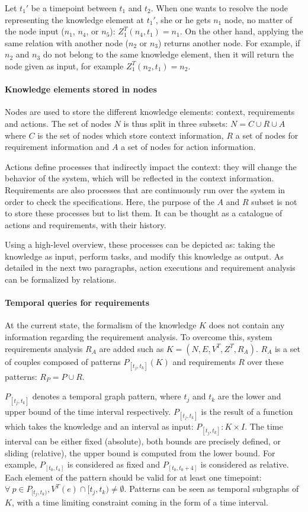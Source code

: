 Let $t_1'$ be a timepoint between $t_1$ and $t_2$.
When one wants to resolve the node representing the knowledge element at $t_1'$, she or he gets $n_1$ node, no matter of the node input ($n_1$, $n_4$, or $n_5$): $Z^{T}_1(n_4, t_1) = n_1$.
On the other hand, applying the same relation with another node ($n_2$ or $n_3$) returns another node.
For example, if $n_2$ and $n_3$ do not belong to the same knowledge element, then it will return the node given as input, for example $Z^{T}_1(n_2, t_1) = n_2$.

\paragraph{Knowledge elements stored in nodes}
Nodes are used to store the different knowledge elements: context, requirements and actions.
The set of nodes $N$ is thus split in three subsets: $N = C \cup R \cup A$ where $C$ is the set of nodes which store context information, $R$ a set of nodes for requirement information and $A$ a set of nodes for action information.

Actions define processes that indirectly impact the context: they will change the behavior of the system, which will be reflected in the context information.
Requirements are also processes that are continuously run over the system in order to check the specifications.
Here, the purpose of the $A$ and $R$ subset is not to store these processes but to list them.
It can be thought as a catalogue of actions and requirements, with their history.

Using a high-level overview, these processes can be depicted as: taking the knowledge as input, perform tasks, and modify this knowledge as output.
As detailed in the next two paragraphs, action executions and requirement analysis can be formalized by relations.

\paragraph{Temporal queries for requirements}
At the current state, the formalism of the knowledge $K$ does not contain any information regarding the requirement analysis.
To overcome this, system requirements analysis $R_A$ are added such as $K = (N, E, V^T, Z^T, R_A)$.
$R_A$ is a set of couples composed of patterns $P_{[t_j,t_k]}(K)$ and requirements $R$ over these patterns: $R_P = {P \cup R}$. 

$P_{[t_j, t_k]}$ denotes a temporal graph pattern, where $t_j$ and $t_k$ are the lower and upper bound of the time interval respectively.
$P_{[t_j, t_k]}$ is the result of a function which takes the knowledge and an interval as input: $P_{[t_j, t_k]} : K \times I$.
The time interval can be either fixed (absolute), \ie both bounds are precisely defined, or sliding (relative), \ie the upper bound is computed from the lower bound.
For example, $P_{[t_0, t_4]}$ is considered as fixed and $P_{[t_0, t_0+4]}$ is considered as relative.
Each element of the pattern should be valid for at least one timepoint: $\forall~p \in P_{[t_j,t_k)}, V^T(e) \cap [t_j,t_k) \neq \emptyset$.
Patterns can be seen as temporal subgraphs of $K$, with a time limiting constraint coming in the form of a time interval.

